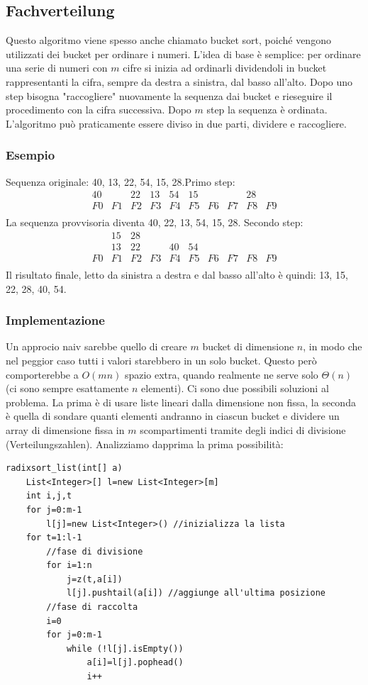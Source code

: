 \documentclass[a4paper]{book}
\begin{document}
\subsection{Fachverteilung}
Questo algoritmo viene spesso anche chiamato bucket sort, poiché vengono utilizzati dei bucket per ordinare i numeri. L'idea di base è semplice: per ordinare una serie di numeri con $m$ cifre si inizia ad ordinarli dividendoli in bucket rappresentanti la cifra, sempre da destra a sinistra, dal basso all'alto. Dopo uno step bisogna "raccogliere" nuovamente la sequenza dai bucket e rieseguire il procedimento con la cifra successiva. Dopo $m$ step la sequenza è ordinata. L'algoritmo può praticamente essere diviso in due parti, dividere e raccogliere.
\subsubsection*{Esempio}
Sequenza originale: 40, 13, 22, 54, 15, 28.Primo step:    
\[\begin{array}{*{20}{c}}
{40}&{ }&{22}&{13}&{54}&{15}&{ }&{ }&{28}&{ }\\
{F0}&{F1}&{F2}&{F3}&{F4}&{F5}&{F6}&{F7}&{F8}&{F9}\\
\end{array}\]
La sequenza provvisoria diventa 40, 22, 13, 54, 15, 28. Secondo step:
\[\begin{array}{*{20}{c}}
{ }&{15}&{28}&{ }&{ }&{ }&{ }&{ }&{ }&{ }\\
{ }&{13}&{22}&{ }&{40}&{54}&{ }&{ }&{ }&{ }\\
{F0}&{F1}&{F2}&{F3}&{F4}&{F5}&{F6}&{F7}&{F8}&{F9}\\
\end{array}\]
Il risultato finale, letto da sinistra a destra e dal basso all'alto è quindi: 13, 15, 22, 28, 40, 54.
\subsubsection*{Implementazione}
Un approcio naiv sarebbe quello di creare $m$ bucket di dimensione $n$, in modo che nel peggior caso tutti i valori starebbero in un solo bucket. Questo però comporterebbe a $O(mn)$ spazio extra, quando realmente ne serve solo $\Theta (n)$ (ci sono sempre esattamente $n$ elementi). Ci sono due possibili soluzioni al problema. La prima è di usare liste lineari dalla dimensione non fissa, la seconda è quella di sondare quanti elementi andranno in ciascun bucket e dividere un array di dimensione fissa in $m$ scompartimenti tramite degli indici di divisione (Verteilungszahlen). Analizziamo dapprima la prima possibilità:
\begin{lstlisting}
radixsort_list(int[] a)
	List<Integer>[] l=new List<Integer>[m]
	int i,j,t
	for j=0:m-1
		l[j]=new List<Integer>() //inizializza la lista
	for t=1:l-1
		//fase di divisione
		for i=1:n
			j=z(t,a[i])
			l[j].pushtail(a[i]) //aggiunge all'ultima posizione
		//fase di raccolta
		i=0
		for j=0:m-1
			while (!l[j].isEmpty())
				a[i]=l[j].pophead()
				i++
				
\end{lstlisting}
\end{document}
